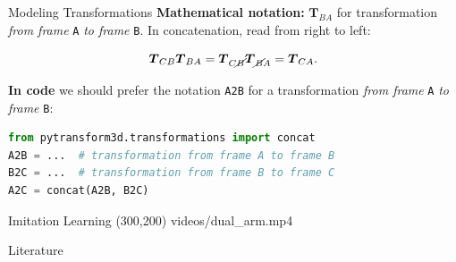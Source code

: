 \documentclass[14pt,aspectratio=169]{beamer}
\begin{document}

\begin{frame}{Modeling Transformations}
\textbf{Mathematical notation:}
$\boldsymbol{T}_{BA}$ for transformation \textit{from frame} \texttt{A} \textit{to frame}
\texttt{B}. In concatenation, read from right to left:

\[
\boldsymbol{T}_{CB} \boldsymbol{T}_{BA} = \boldsymbol{T}_{C\cancel{B}} \boldsymbol{T}_{\cancel{B}A} = \boldsymbol{T}_{CA}.
\]

\vfill

\textbf{In code} we should prefer the notation \texttt{A2B}
for a transformation \textit{from frame} \texttt{A} \textit{to frame} \texttt{B}:

\begin{lstlisting}[language=Python]
from pytransform3d.transformations import concat
A2B = ...  # transformation from frame A to frame B
B2C = ...  # transformation from frame B to frame C
A2C = concat(A2B, B2C)
\end{lstlisting}
\end{frame}

\begin{frame}[fragile]{Imitation Learning}
\makebox(300,200){
{videos/dual_arm.mp4}}
\end{frame}

\begin{frame}[t,allowframebreaks]{Literature}
\printbibliography[heading=none]
\end{frame}
\end{document}
